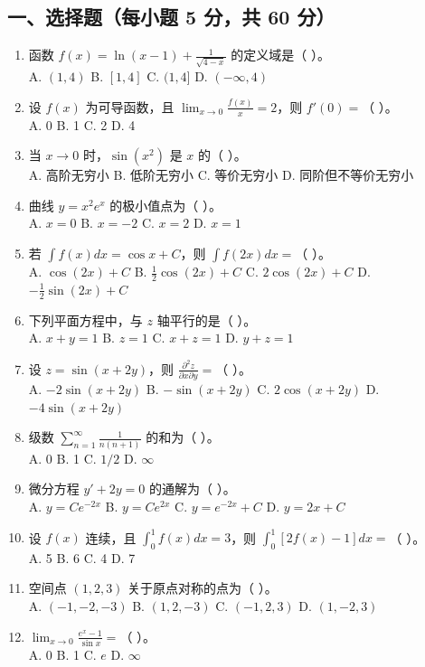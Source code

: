 \documentclass[11pt,a4paper]{article}
\begin{document}
\subsection*{一、选择题（每小题 5 分，共 60 分）}
\begin{enumerate}
    \item 函数 $f(x) = \ln(x-1) + \frac{1}{\sqrt{4-x}}$ 的定义域是（ ）。 \\
    A. $(1, 4)$ \quad B. $[1, 4]$ \quad C. $(1, 4]$ \quad D. $(-\infty, 4)$
    \item 设 $f(x)$ 为可导函数，且 $\lim_{x \to 0} \frac{f(x)}{x} = 2$，则 $f'(0) = $（ ）。 \\
    A. 0 \quad B. 1 \quad C. 2 \quad D. 4
    \item 当 $x \to 0$ 时，$\sin(x^2)$ 是 $x$ 的（ ）。 \\
    A. 高阶无穷小 \quad B. 低阶无穷小 \quad C. 等价无穷小 \quad D. 同阶但不等价无穷小
    \item 曲线 $y = x^2 e^x$ 的极小值点为（ ）。 \\
    A. $x=0$ \quad B. $x=-2$ \quad C. $x=2$ \quad D. $x=1$
    \item 若 $\int f(x) dx = \cos x + C$，则 $\int f(2x) dx = $（ ）。 \\
    A. $\cos(2x) + C$ \quad B. $\frac{1}{2}\cos(2x) + C$ \quad C. $2\cos(2x) + C$ \quad D. $-\frac{1}{2}\sin(2x) + C$
    \item 下列平面方程中，与 $z$ 轴平行的是（ ）。 \\
    A. $x+y=1$ \quad B. $z=1$ \quad C. $x+z=1$ \quad D. $y+z=1$
    \item 设 $z = \sin(x+2y)$，则 $\frac{\partial^2 z}{\partial x \partial y} = $（ ）。 \\
    A. $-2\sin(x+2y)$ \quad B. $-\sin(x+2y)$ \quad C. $2\cos(x+2y)$ \quad D. $-4\sin(x+2y)$
    \item 级数 $\sum_{n=1}^{\infty} \frac{1}{n(n+1)}$ 的和为（ ）。 \\
    A. 0 \quad B. 1 \quad C. $1/2$ \quad D. $\infty$
    \item 微分方程 $y' + 2y = 0$ 的通解为（ ）。 \\
    A. $y = Ce^{-2x}$ \quad B. $y = Ce^{2x}$ \quad C. $y = e^{-2x} + C$ \quad D. $y = 2x + C$
    \item 设 $f(x)$ 连续，且 $\int_0^1 f(x) dx = 3$，则 $\int_0^1 [2f(x) - 1] dx = $（ ）。 \\
    A. 5 \quad B. 6 \quad C. 4 \quad D. 7
    \item 空间点 $(1, 2, 3)$ 关于原点对称的点为（ ）。 \\
    A. $(-1, -2, -3)$ \quad B. $(1, 2, -3)$ \quad C. $(-1, 2, 3)$ \quad D. $(1, -2, 3)$
    \item $\lim_{x \to 0} \frac{e^x - 1}{\sin x} = $（ ）。 \\
    A. 0 \quad B. 1 \quad C. $e$ \quad D. $\infty$
\end{enumerate}
\end{document}
